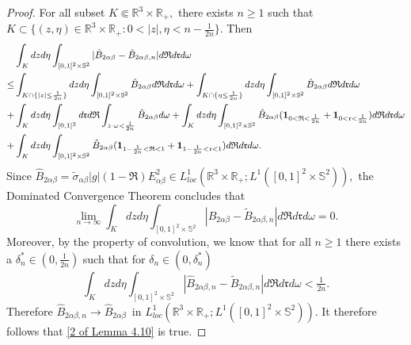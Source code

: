 \documentclass[reqno,11pt]{amsart}
\numberwithin{equation}{section}
\def\R{\mathbb{R}}
\begin{document}
\begin{proof}
For all subset $K \Subset \R^3 \times \R_+,$ there exists $n \geq 1 $ such that $K \subset \{(z,\eta ) \in \R^3 \times \R_+ : 0<|z|,\eta <n-\frac{1}{2n}\}$. Then
	\begin{equation*}{\small
		\begin{aligned}
			&\int_{K} dzd\eta \int_{[0,1]^2 \times \mathbb{S}^2 } |\hat{B}_{2\alpha \beta }-\tilde{B}_{2\alpha \beta ,n}|d\mathfrak{R}d\mathfrak{r}d\omega \\
			\leq & \int_{K \cap \{|z|\leq \frac{1}{2n}\}} dzd\eta \int_{[0,1]^2 \times \mathbb{S}^2 } \hat{B}_{2\alpha \beta } d\mathfrak{R}d\mathfrak{r}d\omega + \int_{K \cap \{\eta \leq \frac{1}{2n}\}} dzd\eta \int_{[0,1]^2 \times \mathbb{S}^2 } \hat{B}_{2\alpha \beta } d\mathfrak{R}d\mathfrak{r}d\omega \\
		+& \int_{K} d z d \eta \int_{ [0,1]^2 } d \mathfrak{r} d \mathfrak{R} \int_{ z \cdot \omega < \frac{1}{2n}} \hat{B}_{ 2 \alpha \beta } d \omega +\int_{K} dzd\eta \int_{[0,1]^2 \times \mathbb{S}^2 } \hat{B}_{2\alpha \beta } (\mathbf{1}_{0<\mathfrak{R}<\frac{1}{2n}}+\mathbf{1}_{0<\mathfrak{r}<\frac{1}{2n}}) d\mathfrak{R}d\mathfrak{r}d\omega\\
  +& \int_{K} dzd\eta \int_{[0,1]^2 \times \mathbb{S}^2 } \hat{B}_{2\alpha \beta } (\mathbf{1}_{1-\frac{1}{2n}<\mathfrak{R}<1}+ \mathbf{1}_{1-\frac{1}{2n}<\mathfrak{r}<1}) d\mathfrak{R}d\mathfrak{r}d\omega.
		\end{aligned}}
	\end{equation*}
	Since $\hat{B}_{2\alpha \beta }=\tilde{\sigma}_{\alpha \beta }|g|(1-\mathfrak{R})E^2_{\alpha \beta } \in L^1_{loc} (\R^3 \times \R_+;L^1 ([0,1]^2 \times \mathbb{S}^2)),$ the Dominated Convergence Theorem concludes that 
	\begin{equation*}
		\lim \limits_{n\rightarrow \infty } \int_{K} dzd\eta \int_{[0,1]^2 \times \mathbb{S}^2 } |\hat{B}_{2\alpha \beta }-\tilde{B}_{2\alpha \beta ,n}|d\mathfrak{R}d\mathfrak{r}d\omega =0.
	\end{equation*}
Moreover, by the property of convolution, we know that for all $n \geq 1$ there exists a $\delta_n^* \in (0,\frac{1}{2n})$ such that for $\delta_n \in (0, \delta_n^*)$
	\begin{equation*}
		\int_{K} dzd\eta \int_{[0,1]^2 \times \mathbb{S}^2 } |\hat{B}_{2\alpha \beta ,n }-\tilde{B}_{2\alpha \beta ,n}|d\mathfrak{R}d\mathfrak{r}d\omega <\tfrac{1}{2n}.
	\end{equation*}
	Therefore $\hat{B}_{2\alpha \beta ,n } \rightarrow \hat{B}_{2\alpha \beta} \enspace $in $L^1_{loc} (\R^3\times \R_+ ; L^1([0,1]^2 \times \mathbb{S}^2 ))$. It therefore follows that \eqref{2 of Lemma 4.10} is true. 


\end{proof}
\end{document}
